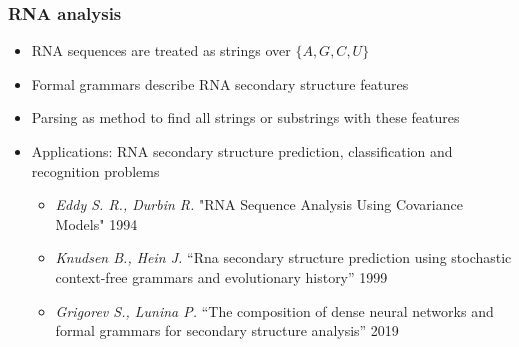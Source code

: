 \documentclass[xcolor=table]{beamer}
\begin{document}
\begin{frame}[fragile] \frametitle{RNA analysis}

\begin{itemize}
    \item RNA sequences are treated as strings over $\{A, G, C, U\}$
    \item Formal grammars describe RNA secondary structure features
    \item Parsing as method to find all strings or substrings with these features
    \item Applications: RNA secondary structure prediction, classification and recognition problems
    \begin{itemize}
        \item \emph{Eddy S. R., Durbin R.} "RNA Sequence Analysis Using Covariance Models" 1994
        \item \emph{Knudsen B., Hein J.} “Rna secondary structure prediction using stochastic context-free grammars and evolutionary history” 1999
        \item \emph{Grigorev S., Lunina P.} “The composition of dense neural networks and formal grammars for secondary structure analysis” 2019
    \end{itemize}
\end{itemize}
    
\end{frame}



\end{document}
